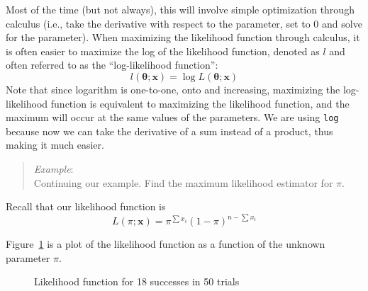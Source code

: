 \documentclass[
  letterpaper,
  DIV=11,
  numbers=noendperiod]{scrreprt}
\begin{document}
Most of the time (but not always), this will involve simple optimization
through calculus (i.e., take the derivative with respect to the
parameter, set to 0 and solve for the parameter). When maximizing the
likelihood function through calculus, it is often easier to maximize the
log of the likelihood function, denoted as \(l\) and often referred to
as the ``log-likelihood function'': \[
l(\boldsymbol{\theta};\boldsymbol{x})= \log L(\boldsymbol{\theta};\boldsymbol{x}) 
\] Note that since logarithm is one-to-one, onto and increasing,
maximizing the log-likelihood function is equivalent to maximizing the
likelihood function, and the maximum will occur at the same values of
the parameters. We are using \texttt{log} because now we can take the
derivative of a sum instead of a product, thus making it much easier.

\begin{quote}
\emph{Example}:\\
Continuing our example. Find the maximum likelihood estimator for
\(\pi\).
\end{quote}

Recall that our likelihood function is \[
L(\pi;\boldsymbol{x})= \pi^{\sum x_i}(1-\pi)^{n-\sum x_i}
\]

Figure~\ref{fig-lik1} is a plot of the likelihood function as a function
of the unknown parameter \(\pi\).

\begin{figure}


\caption{\label{fig-lik1}Likelihood function for 18 successes in 50
trials}

\end{figure}%
\end{document}
